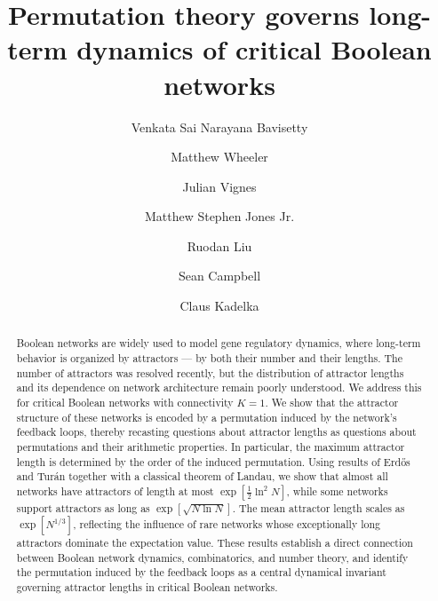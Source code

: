 \documentclass[11pt, reqno]{elsarticle}%
\theoremstyle{plain}
\begin{document}
\author[a]{Venkata Sai Narayana Bavisetty}
\author[b]{Matthew Wheeler}
\author[c]{Julian Vignes}
\author[d]{Matthew Stephen Jones Jr.}
\author[e]{Ruodan Liu}
\author[e]{Sean Campbell}
\author[e]{Claus Kadelka}



\address[a]{Department of Integrative Biology and Physiology, University of California, Los Angeles, CA, 90095, United States}
\address[b]{Department of Medicine, University of Florida, Gainesville, FL, 32611, United States}
\address[c]{Ponte Vedra High School, Ponte Vedra Beach, FL, 32081, United States}
\address[d]{Watchung Hills Regional High School, Warren, NJ, 07059, United States
}
\address[e]{Department of Mathematics, Iowa State University, Ames, IA 50011, United States}




\title{Permutation theory governs long-term dynamics of critical Boolean networks}






\begin{abstract}
Boolean networks are widely used to model gene regulatory dynamics, where long-term behavior is organized by attractors — by both their number and their lengths. The number of attractors was resolved recently, but the distribution of attractor lengths and its dependence on network architecture remain poorly understood.
We address this for critical Boolean networks with connectivity $K=1$.
We show that the attractor structure of these networks is encoded by a permutation induced by the network's feedback loops, thereby recasting questions about attractor lengths as questions about permutations and their arithmetic properties. 
In particular, the maximum attractor length is determined by the order of the induced permutation.
Using results of Erd\H{o}s and Tur\'an together with a classical theorem of Landau, we show that almost all networks have attractors of length at most $\exp[\tfrac{1}{2}\ln^2 N]$, while some networks support attractors as long as $\exp[\sqrt{N\ln N}]$. 
The mean attractor length scales as $\exp[N^{1/3}]$, reflecting the influence of rare networks whose exceptionally long attractors dominate the expectation value.
These results establish a direct connection between Boolean network dynamics, combinatorics, and number theory, and identify the permutation induced by the feedback loops as a central dynamical invariant governing attractor lengths in critical Boolean networks.
\end{abstract}
\end{document}
